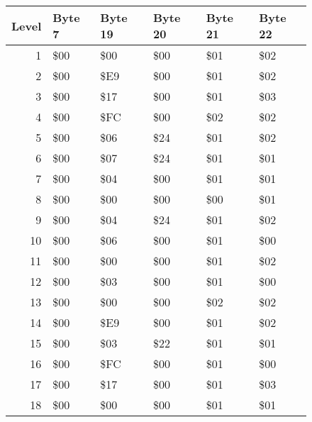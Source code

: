 \begin{figure}[H]
  {
    \setlength{\tabcolsep}{3.0pt}
    \setlength\cmidrulewidth{\heavyrulewidth} %
    \begin{adjustbox}{width=\textwidth}

      \begin{tabular}{rlllll}
        \toprule
        Level & Byte 7    & Byte 19   & Byte 20   & Byte 21   & Byte 22   \\
        \midrule
        1 & \$00       & \$00       & \$00       & \$01       & \$02       \\
        2 & \$00       & \$E9       & \$00       & \$01       & \$02       \\
        3 & \$00       & \$17       & \$00       & \$01       & \$03       \\
        4 & \$00       & \$FC       & \$00       & \$02       & \$02       \\
        5 & \$00       & \$06       & \$24       & \$01       & \$02       \\
        6 & \$00       & \$07       & \$24       & \$01       & \$01       \\
        7 & \$00       & \$04       & \$00       & \$01       & \$01       \\
        8 & \$00       & \$00       & \$00       & \$00       & \$01       \\
        9 & \$00       & \$04       & \$24       & \$01       & \$02       \\
        10 & \$00       & \$06       & \$00       & \$01       & \$00       \\
        11 & \$00       & \$00       & \$00       & \$01       & \$02       \\
        12 & \$00       & \$03       & \$00       & \$01       & \$00       \\
        13 & \$00       & \$00       & \$00       & \$02       & \$02       \\
        14 & \$00       & \$E9       & \$00       & \$01       & \$02       \\
        15 & \$00       & \$03       & \$22       & \$01       & \$01       \\
        16 & \$00       & \$FC       & \$00       & \$01       & \$00       \\
        17 & \$00       & \$17       & \$00       & \$01       & \$03       \\
        18 & \$00       & \$00       & \$00       & \$01       & \$01       \\

\end{tabular}
\end{adjustbox}}
\end{figure}

